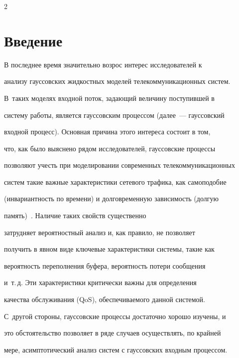       \begin{multicols}{2}





            \label{st\stat}





\section{Введение}





В последнее время значительно возрос интерес исследователей к


анализу гауссовских жидкостных моделей  телекоммуникационных систем.


В~таких моделях входной поток, задающий величину поступившей в


сис\-те\-му работы, является гауссовским процессом (далее~--- гауссовский


входной процесс). Основная причина этого интереса состоит в том,


что, как было выяснено рядом исследователей, гауссовские процессы


позволяют учесть при моделировании современных телекоммуникационных


систем такие важные характеристики сетевого трафика, как самоподобие


(инвариантность по времени) и долговременную зависимость (долгую


память)~\cite{Leland, Willinger}. Наличие таких свойств существенно


затрудняет вероятностный анализ и, как правило, не позволяет


получить в явном виде ключевые характеристики системы, такие как


вероятность переполнения буфера, вероятность потери сообщения 


и~т.\,д. Эти характеристики   критически важны  для определения


качества обслуживания (QoS), обеспечиваемого данной системой. 


С~другой стороны, гауссовские процессы  достаточно хорошо изучены, и


это обстоятельство позволяет в ряде случаев осуществлять, по крайней


мере, асимптотический анализ систем с гауссовских входным процессом.






\end{multicols}
